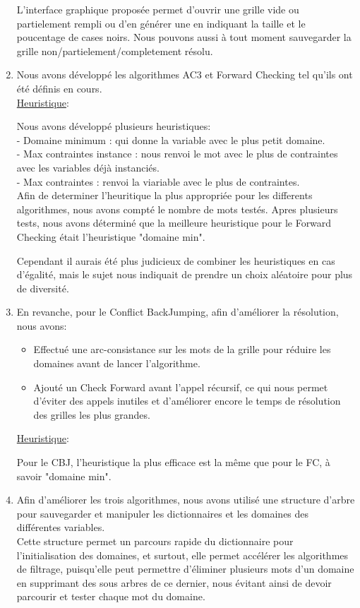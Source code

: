 \documentclass[a4paper,12pt]{report}
\begin{document}
\begin{enumerate}
L'interface graphique proposée permet d'ouvrir une grille vide ou partielement rempli ou d'en générer une en indiquant la taille et le poucentage de cases noirs. Nous pouvons aussi à tout moment sauvegarder la grille non/partielement/completement résolu. \\

\item Nous avons développé les algorithmes AC3 et Forward Checking tel qu'ils ont été définis en cours. \\

\ul{Heuristique}:

Nous avons développé plusieurs heuristiques:\\
 - Domaine minimum : qui donne la variable avec le plus petit domaine.\\
 - Max contraintes instance : nous renvoi le mot avec le plus de contraintes avec les variables déjà instanciés.\\
 - Max contraintes : renvoi la viariable avec le plus de contraintes.\\
 
Afin de determiner l'heuritique la plus appropriée pour les differents algorithmes, nous avons compté le nombre de mots testés.
Apres plusieurs tests, nous avons déterminé que la meilleure heuristique pour le Forward Checking était l'heuristique "domaine min". 

Cependant il aurais été plus judicieux de combiner les heuristiques en cas d'égalité, mais le sujet nous indiquait de prendre un choix aléatoire pour plus de diversité.\\

\item En revanche, pour le Conflict BackJumping, afin d’améliorer la résolution, nous avons:
\begin{itemize}
\item Effectué une arc-consistance sur les mots de la grille pour réduire les domaines avant de lancer l'algorithme.
\item Ajouté un Check Forward avant l'appel récursif, ce qui nous permet d'éviter des appels inutiles et d'améliorer encore le temps de résolution des grilles les plus grandes.\\
\end{itemize}

\ul{Heuristique}:

Pour le CBJ, l'heuristique la plus efficace est la même que pour le FC, à savoir "domaine min".\\

\item Afin d'améliorer les trois algorithmes, nous avons utilisé une structure d'arbre pour sauvegarder et manipuler les dictionnaires et les domaines des différentes variables.\\
 Cette structure permet un parcours rapide du dictionnaire pour l'initialisation des domaines, et surtout, elle permet accélérer les algorithmes de filtrage, puisqu'elle peut permettre d'éliminer plusieurs mots d'un domaine en supprimant des sous arbres de ce dernier, nous évitant ainsi de devoir parcourir et tester chaque mot du domaine.\\
\end{enumerate}
\end{document}
